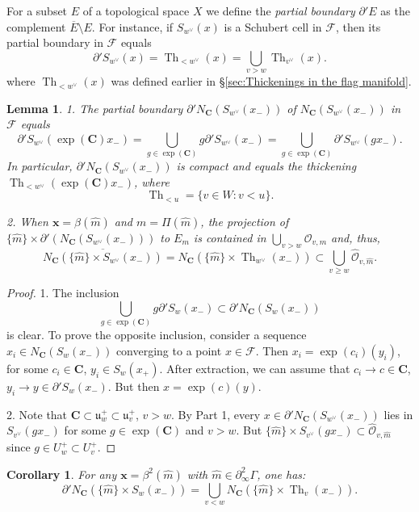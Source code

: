 \documentclass[12pt]{amsbook}%
\newtheorem{lem}[thm]{Lemma}
\newtheorem{cor}[thm]{Corollary}
\theoremstyle{definition}
\theoremstyle{remark}
\numberwithin{section}{chapter}
\numberwithin{subsection}{section}
\numberwithin{figure}{chapter}
\DeclareMathOperator{\Th}{Th}
\def\cF{{\mathscr{F}}}
\def\cO{{\mathscr{O}}}
\def\CC{{\mathbf{C}}}
\def\bx{\mathbf{x}}
\def\ol{\overline}
\begin{document}
{{For a subset $E$ of a topological space $X$ we define the {\em partial boundary} $\partial' E$ as the complement $\ol{E}\setminus E$. 
For instance, if $S_{w^\vee}(x)$ is a Schubert cell in $\cF$, then its partial boundary in $\cF$ equals 
$$
\partial' S_{w^\vee} (x) = \Th_{< w^\vee}(x) =\bigcup_{v> w} \Th_{v^\vee}(x).
$$
where $ \Th_{<w^\vee}(x)$ was defined earlier  in \S \ref{sec:Thickenings in the flag manifold}.

\begin{lem}\label{lem:compactifications of leaves} 
1. The partial boundary $\partial' N_{\CC}(S_{w^\vee}(x_-))$ of $N_{\CC}(S_{w^\vee}(x_-))$ in $\cF$ equals
$$
\partial' S_{w^\vee}(\exp({\CC})x_-)= \bigcup_{g\in \exp({\CC})} g \partial' S_{w^\vee}(x_-)= \bigcup_{g\in \exp({\CC})}  \partial' S_{w^\vee}(g x_-). 
$$
 In particular, $\partial' N_{\CC}(S_{w^\vee}(x_-))$ is compact and equals the thickening $\Th_{<w^\vee}( \exp({\CC})x_-)$, where 
$$
 \Th_{< u}= \{v\in W: v< u\}. 
$$ 

2. When $\bx = \beta(\hat{m})$ and $m=\Pi(\hat{m})$,
the projection of $\{ \hat{m}\} \times \partial'(N_{\CC}(S_{w^\vee}(x_-)))$ to $E_m$ is contained in $\bigcup_{v>w} \cO_{v,m}$ and, thus,
$$
\ol{N_{\CC}(\{ \hat{m} \} \times S_{w^\vee}(x_-))}= N_{\CC}(\{ \hat{m} \}\times \Th_{w^\vee}(x_-))\subset \bigcup_{v\ge w} \hat{\cO}_{v, \hat{m}}. 
$$
\end{lem}
\begin{proof} 1. The inclusion 
$$
\bigcup_{g\in \exp({\CC})} g \partial' S_w(x_-) \subset \partial' N_{\CC}(S_w(x_-))
$$
is clear. To prove the opposite inclusion, consider a sequence $x_i\in N_{\CC}(S_w(x_-))$ converging to a point $x\in \cF$. Then  
$x_i= \exp(c_i)(y_i)$, for some $c_i\in \CC$, $y_i\in S_w(x_+)$. After extraction, we can assume that  $c_i\to c\in \CC$, $y_i\to y\in \partial' S_w(x_-)$. 
But then $x= \exp(c)(y)$. 

2.  Note that $\CC\subset  \mathfrak{u}_w^+\subset  \mathfrak{u}_v^+$, $v> w$. By Part 1, every $x\in \partial' N_{\CC}(S_{w^\vee}(x_-))$ lies in  
$S_{v^\vee}(g x_-)$ for some $g\in \exp({\CC})$ and $v> w$. But  $\{ \hat{m} \} \times S_{v^\vee}(g x_-)\subset \hat{\cO}_{v,\hat{m}}$ since $g\in U_w^+\subset U_v^+$. 
\end{proof}

\begin{cor} For any $\bx = \beta^2(\hat{m})$ with $\hat{m} \in \partial_\infty^2 \Gamma$, one has:
$$
\partial' N_{\CC}( \{\hat{m}\} \times S_w(x_-))= \bigcup_{v<w} N_{\CC}( \{ \hat{m} \} \times \Th_v(x_-)). 
$$
\end{cor}

}}
\end{document}
